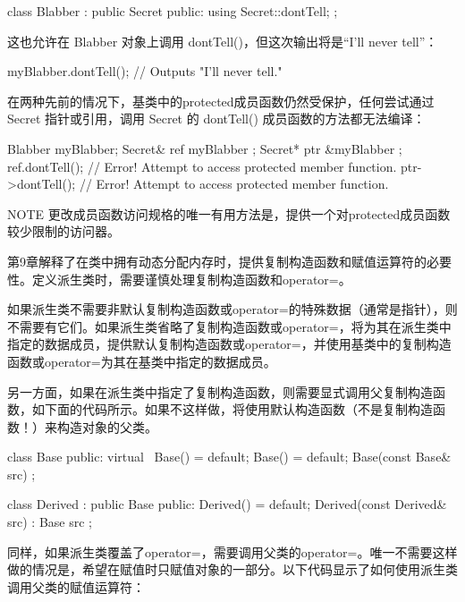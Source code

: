 \begin{cpp}
class Blabber : public Secret
{
    public:
        using Secret::dontTell;
};
\end{cpp}

这也允许在 Blabber 对象上调用 dontTell()，但这次输出将是“I’ll never tell”：

\begin{cpp}
myBlabber.dontTell(); // Outputs "I'll never tell."
\end{cpp}

在两种先前的情况下，基类中的protected成员函数仍然受保护，任何尝试通过 Secret 指针或引用，调用 Secret 的 dontTell() 成员函数的方法都无法编译：

\begin{cpp}
Blabber myBlabber;
Secret& ref { myBlabber };
Secret* ptr { &myBlabber };
ref.dontTell(); // Error! Attempt to access protected member function.
ptr->dontTell(); // Error! Attempt to access protected member function.
\end{cpp}

\begin{myNotic}{NOTE}
更改成员函数访问规格的唯一有用方法是，提供一个对protected成员函数较少限制的访问器。
\end{myNotic}


第9章解释了在类中拥有动态分配内存时，提供复制构造函数和赋值运算符的必要性。定义派生类时，需要谨慎处理复制构造函数和operator=。

如果派生类不需要非默认复制构造函数或operator=的特殊数据（通常是指针），则不需要有它们。如果派生类省略了复制构造函数或operator=，将为其在派生类中指定的数据成员，提供默认复制构造函数或operator=，并使用基类中的复制构造函数或operator=为其在基类中指定的数据成员。

另一方面，如果在派生类中指定了复制构造函数，则需要显式调用父复制构造函数，如下面的代码所示。如果不这样做，将使用默认构造函数（不是复制构造函数！）来构造对象的父类。

\begin{cpp}
class Base
{
    public:
        virtual ~Base() = default;
        Base() = default;
        Base(const Base& src) { }
};

class Derived : public Base
{
    public:
        Derived() = default;
        Derived(const Derived& src) : Base { src } { }
};
\end{cpp}

同样，如果派生类覆盖了operator=，需要调用父类的operator=。唯一不需要这样做的情况是，希望在赋值时只赋值对象的一部分。以下代码显示了如何使用派生类调用父类的赋值运算符：

